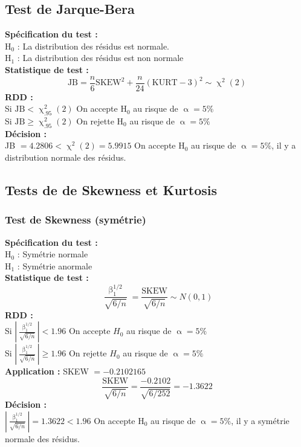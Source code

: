 \documentclass[A4paper]{article}
\begin{document}
\subsection{Test de Jarque-Bera}
\textbf{Spécification du test :}\\
H$_0$ : La distribution des résidus est normale. \\
H$_1$ : La distribution des résidus est non normale\\
\textbf{Statistique de test :}
\begin{equation*}
	\text{JB} = \frac{n}{6} \text{SKEW}^2 + \frac{n}{24} (\text{KURT} -3)^2 \sim \upchi^2(2)		
\end{equation*}
\textbf{RDD :} \\
Si  $\text{JB} < \upchi^2_{.95}(2)$  On accepte  H$_0$  au risque de  $\upalpha = 5\%$ \\
Si  $\text{JB} \ge  \upchi^2_{.95}(2)$  On rejette  H$_0$  au risque de  $\upalpha = 5\%$  \\
\textbf{Décision :} \\
JB $= 4.2806 < \upchi^2(2) = 5.9915$ On accepte H$_0$ au risque de $\upalpha = 5\%$, il y a distribution normale des résidus.
\subsection{Tests de de Skewness et Kurtosis}
\subsubsection{Test de Skewness (symétrie)}
\textbf{Spécification du test :} \\
H$_0$ : Symétrie normale \\
H$_1$ : Symétrie anormale \\
\textbf{Statistique de test :}
\begin{equation*}
		\frac{\upbeta_1^{1/2}}{\sqrt{6/n}}=  \frac{\text{SKEW}}{\sqrt{6/n}} \sim N(0,1)
\end{equation*}
\textbf{RDD :} \\
Si $\left| \frac{\upbeta^{1/2}_1}{\sqrt{6/n}} \right|  < 1.96$ On accepte $H_0$ au risque de $\upalpha = 5\% $\\
Si $\left| \frac{\upbeta^{1/2}_1}{\sqrt{6/n}} \right|  \geq 1.96$ On rejette $H_0$ au risque de $\upalpha = 5\%$ \\
\textbf{Application :} SKEW $= -0.2102165$
\begin{equation*}
	\frac{\text{SKEW}}{\sqrt{6/n}} = \frac{-0.2102}{\sqrt{6/252}} = -1.3622
\end{equation*}
\textbf{Décision :}\\
$\left| \frac{\upbeta^{1/2}_1}{\sqrt{6/n}} \right| = 1.3622 < 1.96 $ On accepte H$_0$ au risque de  $\upalpha=5\%$, il y a symétrie normale des résidus.
\newpage
\end{document}
